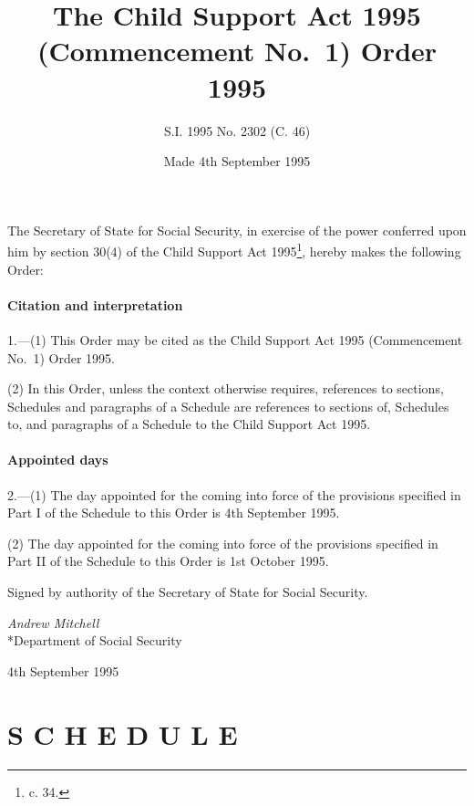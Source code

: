 \documentclass[a4paper]{article}
\title{The Child Support Act 1995 (Commencement No.\ 1) Order 1995}
\author{S.I. 1995 No. 2302 (C. 46)}
\date{Made 4th September 1995}
\begin{document}
\maketitle

\noindent
The Secretary of State for Social Security, in exercise of the power conferred upon him by section 30(4) of the Child Support Act 1995\footnote{ c. 34.}, hereby makes the following Order:

{\sloppy

\tableofcontents

}

\setcounter{secnumdepth}{-2}

\subsection[1. Citation and interpretation]{Citation and interpretation}

1.—(1) This Order may be cited as the Child Support Act 1995 (Commencement No.\ 1) Order 1995.

(2) In this Order, unless the context otherwise requires, references to sections, Schedules and paragraphs of a Schedule are references to sections of, Schedules to, and paragraphs of a Schedule to the Child Support Act 1995.

\subsection[2. Appointed days]{Appointed days}

2.—(1) The day appointed for the coming into force of the provisions specified in Part I of the Schedule to this Order is 4th September 1995.

(2) The day appointed for the coming into force of the provisions specified in Part II of the Schedule to this Order is 1st October 1995.

\bigskip

Signed by authority of the Secretary of State for Social Security.

{\raggedleft
\emph{Andrew Mitchell}\\*Department of Social Security

}

4th September 1995

\clearpage

\part[Schedule]{S C H E D U L E}
\end{document}
